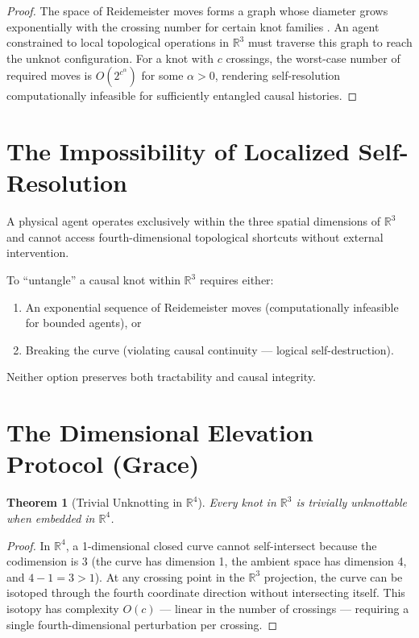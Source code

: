 \documentclass[12pt, a4paper]{article}
\theoremstyle{plain}
\newtheorem{theorem}{Theorem}[section]
\theoremstyle{definition}
\begin{document}
\begin{proof}
The space of Reidemeister moves forms a graph whose diameter grows exponentially with the crossing number for certain knot families \citep{Hass1999}. An agent constrained to local topological operations in $\mathbb{R}^3$ must traverse this graph to reach the unknot configuration. For a knot with $c$ crossings, the worst-case number of required moves is $O(2^{c^{\alpha}})$ for some $\alpha > 0$, rendering self-resolution computationally infeasible for sufficiently entangled causal histories.
\end{proof}

\section{The Impossibility of Localized Self-Resolution}\label{sec:impossibility}

\begin{axiom}
A physical agent operates exclusively within the three spatial dimensions of $\mathbb{R}^3$ and cannot access fourth-dimensional topological shortcuts without external intervention.
\end{axiom}

To ``untangle'' a causal knot within $\mathbb{R}^3$ requires either:
\begin{enumerate}
    \item An exponential sequence of Reidemeister moves (computationally infeasible for bounded agents), or
    \item Breaking the curve (violating causal continuity --- logical self-destruction).
\end{enumerate}

Neither option preserves both tractability and causal integrity.

\section{The Dimensional Elevation Protocol (Grace)}\label{sec:grace}

\begin{theorem}[Trivial Unknotting in $\mathbb{R}^4$]
Every knot in $\mathbb{R}^3$ is trivially unknottable when embedded in $\mathbb{R}^4$.
\end{theorem}

\begin{proof}
In $\mathbb{R}^4$, a 1-dimensional closed curve cannot self-intersect because the codimension is 3 (the curve has dimension 1, the ambient space has dimension 4, and $4 - 1 = 3 > 1$). At any crossing point in the $\mathbb{R}^3$ projection, the curve can be isotoped through the fourth coordinate direction without intersecting itself. This isotopy has complexity $O(c)$ --- linear in the number of crossings --- requiring a single fourth-dimensional perturbation per crossing.
\end{proof}
\end{document}
